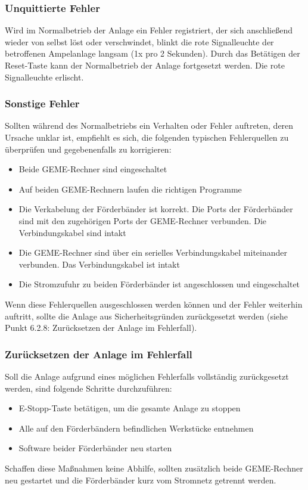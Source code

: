 \documentclass[oneside,a4paper,titlepage]{scrartcl} %
\begin{document}
\subsubsection{Unquittierte Fehler}
Wird im Normalbetrieb der Anlage ein Fehler registriert, der sich anschließend wieder von selbst löst oder verschwindet, blinkt die rote Signalleuchte der betroffenen Ampelanlage langsam (1x pro 2 Sekunden). Durch das Betätigen der Reset-Taste kann der Normalbetrieb der Anlage fortgesetzt werden. Die rote Signalleuchte erlischt.

\subsubsection{Sonstige Fehler}
Sollten während des Normalbetriebs ein Verhalten oder Fehler auftreten, deren Ursache unklar ist, empfiehlt es sich, die folgenden typischen Fehlerquellen zu überprüfen und gegebenenfalls zu korrigieren:
\begin{itemize}
    \item Beide GEME-Rechner sind eingeschaltet
    \item Auf beiden GEME-Rechnern laufen die richtigen Programme
    \item Die Verkabelung der Förderbänder ist korrekt. Die Ports der Förderbänder sind mit den zugehörigen Ports der GEME-Rechner verbunden. Die Verbindungskabel sind intakt
    \item Die GEME-Rechner sind über ein serielles Verbindungskabel miteinander verbunden. Das Verbindungskabel ist intakt
    \item Die Stromzufuhr zu beiden Förderbänder ist angeschlossen und eingeschaltet
\end{itemize}
Wenn diese Fehlerquellen ausgeschlossen werden können und der Fehler weiterhin auftritt, sollte die Anlage aus Sicherheitsgründen zurückgesetzt werden (siehe Punkt 6.2.8: Zurücksetzen der Anlage im Fehlerfall).

\subsubsection{Zurücksetzen der Anlage im Fehlerfall}
Soll die Anlage aufgrund eines möglichen Fehlerfalls vollständig zurückgesetzt werden, sind folgende Schritte durchzuführen:
\begin{itemize}
  \item E-Stopp-Taste betätigen, um die gesamte Anlage zu stoppen
  \item Alle auf den Förderbändern befindlichen Werkstücke entnehmen
  \item Software beider Förderbänder neu starten  
\end{itemize}
Schaffen diese Maßnahmen keine Abhilfe, sollten zusätzlich beide GEME-Rechner neu gestartet und die Förderbänder kurz vom Stromnetz getrennt werden.
\end{document}
